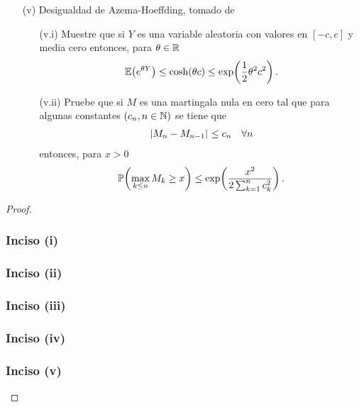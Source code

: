 \begin{problema}
\begin{enumerate}
		\item[(v)]
			Desigualdad de Azema-Hoeffding, tomado de \cite[E14.2, p.237]{MR1155402}
			\begin{enumerate}
				\item[(v.i)] Muestre que si $Y$ es una variable aleatoria con valores en $[-c,c]$ y media cero entonces, para $\theta\in\mathbb{R}$
						\begin{align}
							\mathbb{E}\! \left( e^{\theta Y} \right)\leq\cosh\!\left( \theta c\right) \leq \exp\!\left( \frac{1}{2}\theta^2c^2\right) . 
						\end{align}
				\item[(v.ii)] Pruebe que si $M$ es una martingala nula en cero tal que para algunas constantes $\left( c_n,n\in\mathbb{N}\right) $ se tiene que
						\begin{align}
							\hspace{.25mm}\left|M_n-M_{n-1}\right|\hspace{.25mm}\leq c_n\quad\forall n
						\end{align}
						entonces, para $x>0$
						\begin{align}
							\mathbb{P}\! \left( \max_{k\leq n} M_k\geq x \right)\leq \exp\!\left( \frac{x^2}{2\sum_{k=1}^n c_k^2}\right) .
						\end{align}
			\end{enumerate}
	\end{enumerate}
\end{problema}

\begin{proof}
	\subsubsection{Inciso (i)} 
	
	\newpage
	
	\subsubsection{Inciso (ii)} 
	
	\newpage
		
	\subsubsection{Inciso (iii)} \label{problema2_3:inciso3}
	
	\newpage
	
	\subsubsection{Inciso (iv)} 
	
	\newpage
	
	\subsubsection{Inciso (v)}
	
\end{proof}